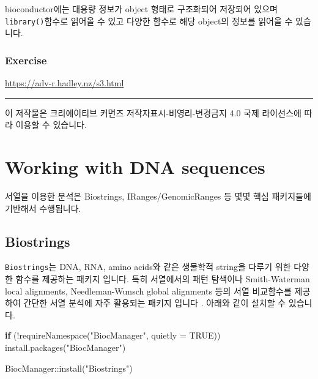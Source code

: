 \documentclass[
]{book}
\newenvironment{Shaded}{\begin{snugshade}}{\end{snugshade}}
\newcommand{\AttributeTok}[1]{\textcolor[rgb]{0.77,0.63,0.00}{#1}}
\newcommand{\ConstantTok}[1]{\textcolor[rgb]{0.00,0.00,0.00}{#1}}
\newcommand{\ControlFlowTok}[1]{\textcolor[rgb]{0.13,0.29,0.53}{\textbf{#1}}}
\newcommand{\FunctionTok}[1]{\textcolor[rgb]{0.00,0.00,0.00}{#1}}
\newcommand{\NormalTok}[1]{#1}
\newcommand{\SpecialCharTok}[1]{\textcolor[rgb]{0.00,0.00,0.00}{#1}}
\newcommand{\StringTok}[1]{\textcolor[rgb]{0.31,0.60,0.02}{#1}}
\begin{document}
bioconductor에는 대용량 정보가 object 형태로 구조화되어 저장되어 있으며 \texttt{library()}함수로 읽어올 수 있고 다양한 함수로 해당 object의 정보를 읽어올 수 있습니다.

\hypertarget{exercise-4}{%
\subsection{Exercise}\label{exercise-4}}

\url{https://adv-r.hadley.nz/s3.html}

\begin{center}\rule{0.5\linewidth}{0.5pt}\end{center}

이 저작물은 크리에이티브 커먼즈 저작자표시-비영리-변경금지 4.0 국제 라이선스에 따라 이용할 수 있습니다.

\hypertarget{working-with-dna-sequences}{%
\chapter{Working with DNA sequences}\label{working-with-dna-sequences}}

서열을 이용한 분석은 Biostrings, IRanges/GenomicRanges 등 몇몇 핵심 패키지들에 기반해서 수행됩니다.

\hypertarget{biostrings}{%
\section{Biostrings}\label{biostrings}}

\texttt{Biostrings}는 DNA, RNA, amino acids와 같은 생물학적 string을 다루기 위한 다양한 함수를 제공하는 패키지 입니다. 특히 서열에서의 패턴 탐색이나 Smith-Waterman local alignments, Needleman-Wunsch global alignments 등의 서열 비교함수를 제공하여 간단한 서열 분석에 자주 활용되는 패키지 입니다 \citep{sippl1999biological}. 아래와 같이 설치할 수 있습니다.

\begin{Shaded}
\begin{Highlighting}[]
\ControlFlowTok{if}\NormalTok{ (}\SpecialCharTok{!}\FunctionTok{requireNamespace}\NormalTok{(}\StringTok{"BiocManager"}\NormalTok{, }\AttributeTok{quietly =} \ConstantTok{TRUE}\NormalTok{))}
    \FunctionTok{install.packages}\NormalTok{(}\StringTok{"BiocManager"}\NormalTok{)}

\NormalTok{BiocManager}\SpecialCharTok{::}\FunctionTok{install}\NormalTok{(}\StringTok{"Biostrings"}\NormalTok{)}
\end{Highlighting}
\end{Shaded}
\end{document}
